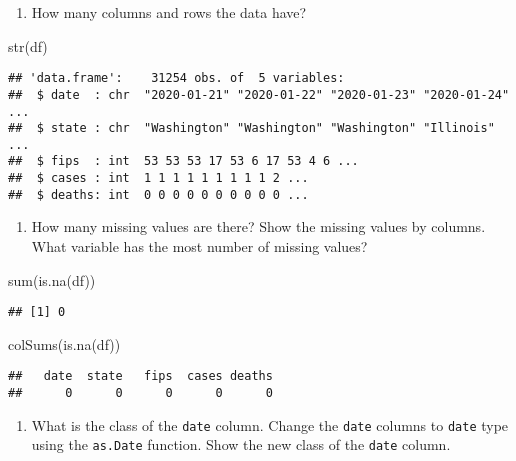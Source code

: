 \documentclass[
]{article}
\newenvironment{Shaded}{\begin{snugshade}}{\end{snugshade}}
\newcommand{\FunctionTok}[1]{\textcolor[rgb]{0.00,0.00,0.00}{#1}}
\newcommand{\NormalTok}[1]{#1}
\providecommand{\tightlist}{%
  \setlength{\itemsep}{0pt}\setlength{\parskip}{0pt}}
\begin{document}
\begin{enumerate}
\def\labelenumi{\arabic{enumi}.}
\setcounter{enumi}{2}
\tightlist
\item
  How many columns and rows the data have?
\end{enumerate}

\begin{Shaded}
\begin{Highlighting}[]
\FunctionTok{str}\NormalTok{(df)}
\end{Highlighting}
\end{Shaded}

\begin{verbatim}
## 'data.frame':    31254 obs. of  5 variables:
##  $ date  : chr  "2020-01-21" "2020-01-22" "2020-01-23" "2020-01-24" ...
##  $ state : chr  "Washington" "Washington" "Washington" "Illinois" ...
##  $ fips  : int  53 53 53 17 53 6 17 53 4 6 ...
##  $ cases : int  1 1 1 1 1 1 1 1 1 2 ...
##  $ deaths: int  0 0 0 0 0 0 0 0 0 0 ...
\end{verbatim}

\begin{enumerate}
\def\labelenumi{\arabic{enumi}.}
\setcounter{enumi}{3}
\tightlist
\item
  How many missing values are there? Show the missing values by columns.
  What variable has the most number of missing values?
\end{enumerate}

\begin{Shaded}
\begin{Highlighting}[]
\FunctionTok{sum}\NormalTok{(}\FunctionTok{is.na}\NormalTok{(df))}
\end{Highlighting}
\end{Shaded}

\begin{verbatim}
## [1] 0
\end{verbatim}

\begin{Shaded}
\begin{Highlighting}[]
\FunctionTok{colSums}\NormalTok{(}\FunctionTok{is.na}\NormalTok{(df))}
\end{Highlighting}
\end{Shaded}

\begin{verbatim}
##   date  state   fips  cases deaths 
##      0      0      0      0      0
\end{verbatim}

\begin{enumerate}
\def\labelenumi{\arabic{enumi}.}
\setcounter{enumi}{4}
\tightlist
\item
  What is the class of the \texttt{date} column. Change the
  \texttt{date} columns to \texttt{date} type using the \texttt{as.Date}
  function. Show the new class of the \texttt{date} column.
\end{enumerate}
\end{document}
